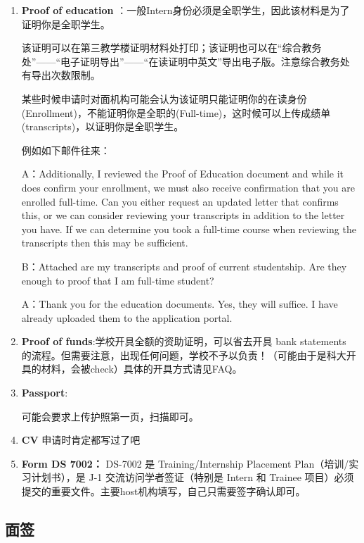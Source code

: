 \begin{enumerate}
    \item \textbf{Proof of education} 
：一般Intern身份必须是全职学生，因此该材料是为了证明你是全职学生。

该证明可以在第三教学楼证明材料处打印；该证明也可以在“综合教务处”——“电子证明导出”——“在读证明中英文”导出电子版。注意综合教务处有导出次数限制。

某些时候申请时对面机构可能会认为该证明只能证明你的在读身份(Enrollment)，不能证明你是全职的(Full-time)，这时候可以上传成绩单(transcripts)，以证明你是全职学生。

例如如下邮件往来：

A：Additionally, I reviewed the Proof of Education document and while it does confirm your enrollment, we must also receive confirmation that you are enrolled full-time. Can you either request an updated letter that confirms this, or we can consider reviewing your transcripts in addition to the letter you have. If we can determine you took a full-time course when reviewing the transcripts then this may be sufficient.

B：Attached are my transcripts and proof of current studentship. Are they enough to proof that I am full-time student?

A：Thank you for the education documents. Yes, they will suffice. I have already uploaded them to the application portal.

\item \textbf{Proof of funds}:学校开具全额的资助证明，可以省去开具 bank statements 的流程。但需要注意，出现任何问题，学校不予以负责！（可能由于是科大开具的材料，会被check）具体的开具方式请见FAQ。

\item \textbf{Passport}:

可能会要求上传护照第一页，扫描即可。

\item \textbf{CV} 申请时肯定都写过了吧

\item  \textbf{Form DS 7002：} DS-7002 是 Training/Internship Placement Plan（培训/实习计划书），是 J-1 交流访问学者签证（特别是 Intern 和 Trainee 项目）必须提交的重要文件。主要host机构填写，自己只需要签字确认即可。

\end{enumerate}

\subsection*{面签}

